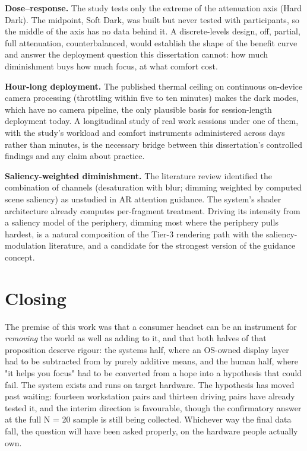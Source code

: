 \textbf{Dose–response.} The study tests only the extreme of the attenuation axis (Hard Dark). The
midpoint, Soft Dark, was built but never tested with participants, so the middle of the axis has no
data behind it. A discrete-levels design, off, partial,
full attenuation, counterbalanced, would establish the shape of the benefit curve and answer the
deployment question this dissertation cannot: how much diminishment buys how much focus, at what
comfort cost.

\textbf{Hour-long deployment.} The published thermal ceiling on continuous on-device camera processing
(throttling within five to ten minutes) makes the dark modes, which have no camera pipeline, the
only plausible basis for session-length deployment today. A longitudinal study of real work sessions
under one of them, with the study's workload and comfort instruments administered across days rather
than minutes, is the necessary bridge between this dissertation's controlled findings and any claim
about practice.

\textbf{Saliency-weighted diminishment.} The literature review identified the combination of channels
(desaturation with blur; dimming weighted by computed scene saliency) as unstudied in AR attention
guidance. The system's shader architecture already computes per-fragment treatment. Driving its
intensity from a saliency model of the periphery, dimming most where the periphery pulls hardest,
is a natural composition of the Tier-3 rendering path with the saliency-modulation literature, and a
candidate for the strongest version of the guidance concept.

\section{Closing}

The premise of this work was that a consumer headset can be an instrument for \textit{removing} the world as
well as adding to it, and that both halves of that proposition deserve rigour: the systems half,
where an OS-owned display layer had to be subtracted from by purely additive means, and the human
half, where "it helps you focus" had to be converted from a hope into a hypothesis that could fail.
The system exists and runs on target hardware. The hypothesis has moved past waiting: fourteen
workstation pairs and thirteen driving pairs have already tested it, and the interim direction is
favourable, though the
confirmatory answer at the full N = 20 sample is still being collected. Whichever way the final data
fall, the question will have been asked properly, on the hardware people actually own.
